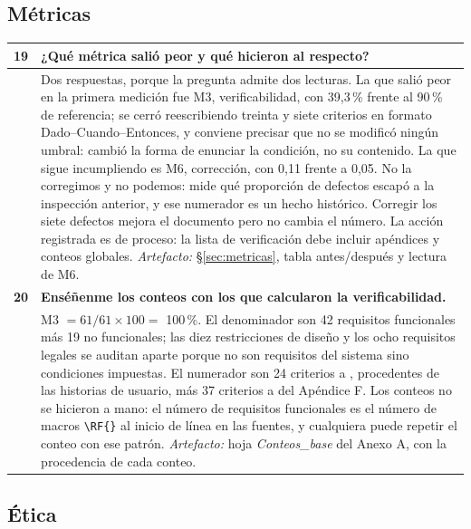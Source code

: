 \begin{longtable}{|C{0.7cm}|L{14.6cm}|}
\end{longtable}

\subsection*{Métricas}

\begin{longtable}{|C{0.7cm}|L{14.6cm}|}
\hline
{}\textbf{19} & \textbf{¿Qué métrica salió peor y qué hicieron al respecto?}\\ \hline
& Dos respuestas, porque la pregunta admite dos lecturas. La que salió peor en la primera medición fue M3, verificabilidad, con 39,3\,\% frente al 90\,\% de referencia; se cerró reescribiendo treinta y siete criterios en formato Dado--Cuando--Entonces, y conviene precisar que no se modificó ningún umbral: cambió la forma de enunciar la condición, no su contenido. La que sigue incumpliendo es M6, corrección, con 0,11 frente a 0,05. No la corregimos y no podemos: mide qué proporción de defectos escapó a la inspección anterior, y ese numerador es un hecho histórico. Corregir los siete defectos mejora el documento pero no cambia el número. La acción registrada es de proceso: la lista de verificación debe incluir apéndices y conteos globales. \newline \emph{Artefacto:} \S\ref{sec:metricas}, tabla antes/después y lectura de M6.\\ \hline
{}\textbf{20} & \textbf{Enséñenme los conteos con los que calcularon la verificabilidad.}\\ \hline
& M3 $= 61/61 \times 100 =$ 100\,\%. El denominador son 42 requisitos funcionales más 19 no funcionales; las diez restricciones de diseño y los ocho requisitos legales se auditan aparte porque no son requisitos del sistema sino condiciones impuestas. El numerador son 24 criterios  a , procedentes de las historias de usuario, más 37 criterios  a  del Apéndice F. Los conteos no se hicieron a mano: el número de requisitos funcionales es el número de macros \verb|\RF{}| al inicio de línea en las fuentes, y cualquiera puede repetir el conteo con ese patrón. \newline \emph{Artefacto:} hoja \emph{Conteos\_base} del Anexo A, con la procedencia de cada conteo.\\ \hline
\end{longtable}

\subsection*{Ética}

